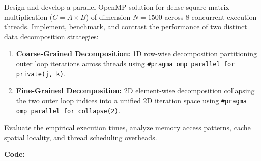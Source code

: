 \documentclass[12pt]{article}
\begin{document}
Design and develop a parallel OpenMP solution for dense square matrix multiplication ($C = A \times B$) of dimension $N = 1500$ across $8$ concurrent execution threads. Implement, benchmark, and contrast the performance of two distinct data decomposition strategies:
\begin{enumerate}
    \item \textbf{Coarse-Grained Decomposition:} 1D row-wise decomposition partitioning outer loop iterations across threads using \texttt{\#pragma omp parallel for private(j, k)}.
    \item \textbf{Fine-Grained Decomposition:} 2D element-wise decomposition collapsing the two outer loop indices into a unified 2D iteration space using \texttt{\#pragma omp parallel for collapse(2)}.
\end{enumerate}
Evaluate the empirical execution times, analyze memory access patterns, cache spatial locality, and thread scheduling overheads.

\vspace{0.3cm}

\textbf{Code:}
\end{document}
